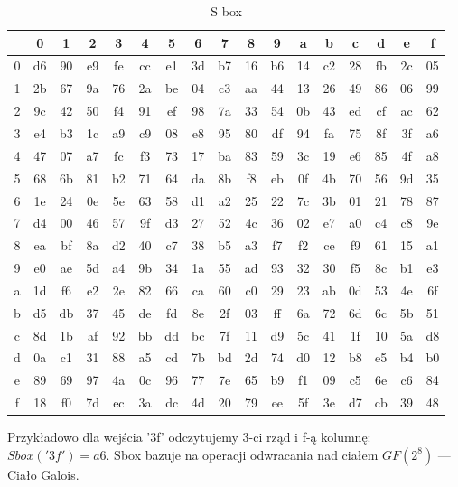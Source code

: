 \begin{table}[h!]
\centering
\caption{S box}
\label{table:sbox}
\begin{tabular}{ | c | cccccccccccccccc | } 
\hline
 & 0 & 1 & 2 & 3 & 4 & 5 & 6 & 7 & 8 & 9 & a & b & c & d & e & f \\
\hline
0 & d6 & 90 & e9 & fe & cc & e1 & 3d & b7 & 16 & b6 & 14 & c2 & 28 & fb & 2c & 05 \\
1 & 2b & 67 & 9a & 76 & 2a & be & 04 & c3 & aa & 44 & 13 & 26 & 49 & 86 & 06 & 99 \\
2 & 9c & 42 & 50 & f4 & 91 & ef & 98 & 7a & 33 & 54 & 0b & 43 & ed & cf & ac & 62 \\
3 & e4 & b3 & 1c & a9 & c9 & 08 & e8 & 95 & 80 & df & 94 & fa & 75 & 8f & 3f & a6 \\
4 & 47 & 07 & a7 & fc & f3 & 73 & 17 & ba & 83 & 59 & 3c & 19 & e6 & 85 & 4f & a8 \\
5 & 68 & 6b & 81 & b2 & 71 & 64 & da & 8b & f8 & eb & 0f & 4b & 70 & 56 & 9d & 35 \\
6 & 1e & 24 & 0e & 5e & 63 & 58 & d1 & a2 & 25 & 22 & 7c & 3b & 01 & 21 & 78 & 87 \\
7 & d4 & 00 & 46 & 57 & 9f & d3 & 27 & 52 & 4c & 36 & 02 & e7 & a0 & c4 & c8 & 9e \\
8 & ea & bf & 8a & d2 & 40 & c7 & 38 & b5 & a3 & f7 & f2 & ce & f9 & 61 & 15 & a1 \\
9 & e0 & ae & 5d & a4 & 9b & 34 & 1a & 55 & ad & 93 & 32 & 30 & f5 & 8c & b1 & e3 \\
a & 1d & f6 & e2 & 2e & 82 & 66 & ca & 60 & c0 & 29 & 23 & ab & 0d & 53 & 4e & 6f \\
b & d5 & db & 37 & 45 & de & fd & 8e & 2f & 03 & ff & 6a & 72 & 6d & 6c & 5b & 51 \\
c & 8d & 1b & af & 92 & bb & dd & bc & 7f & 11 & d9 & 5c & 41 & 1f & 10 & 5a & d8 \\
d & 0a & c1 & 31 & 88 & a5 & cd & 7b & bd & 2d & 74 & d0 & 12 & b8 & e5 & b4 & b0 \\
e & 89 & 69 & 97 & 4a & 0c & 96 & 77 & 7e & 65 & b9 & f1 & 09 & c5 & 6e & c6 & 84 \\
f & 18 & f0 & 7d & ec & 3a & dc & 4d & 20 & 79 & ee & 5f & 3e & d7 & cb & 39 & 48 \\
\hline
\end{tabular}
\end{table}

Przykładowo dla wejścia '3f' odczytujemy 3-ci rząd i f-ą kolumnę: $Sbox('3f') = a6$. Sbox bazuje na operacji odwracania nad ciałem $GF(2^8)$ --- Ciało Galois.

